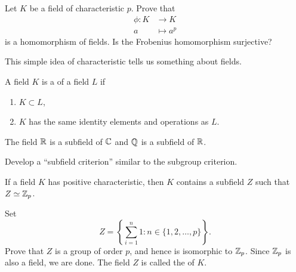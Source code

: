 \documentclass{ximera}
\begin{document}
\begin{example}
  Let $K$ be a field of characteristic $p$. Prove that
  \begin{align*}
    \phi:K &\to K\\
    a &\mapsto a^p
  \end{align*}
  is a homomorphism of fields. Is the Frobenius homomorphism surjective?
\end{example}





This simple idea of characteristic tells us something about fields.

\begin{definition}
  A field $K$ is a  of a field $L$ if
  \begin{enumerate}
  \item $K\subset L$,
  \item $K$ has the same identity elements and operations as $L$.
  \end{enumerate}
\end{definition}

\begin{example}[Subfields]
  The field $\mathbb R$ is a subfield of $\mathbb C$ and $\mathbb Q$ is a subfield of $\mathbb R$.
\end{example}


\begin{exercise}
  Develop a ``subfield criterion'' similar to the subgroup criterion.
\end{exercise}


\begin{theorem}\label{T:bfpc}
  If a field $K$ has positive characteristic, then $K$ contains a
  subfield $Z$ such that $Z\simeq \mathbb Z_p$.
  \begin{sketch}
    Set
    \[
    Z =\left\{\sum_{i=1}^n 1:n\in\{1,2,\dots,p\}\right\}.
    \]
    Prove that $Z$ is a group of order $p$, and hence is isomorphic to
    $\mathbb Z_p$. Since $\mathbb Z_p$ is also a field, we are done. The field $Z$
    is called the  of $K$.
  \end{sketch}
\end{theorem}
\end{document}
